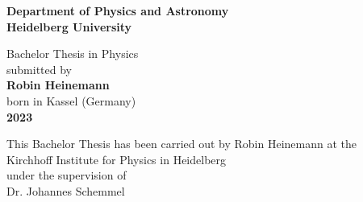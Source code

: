 \begin{titlepage}
\begin{center}
 
\Large\textbf{Department of Physics and Astronomy\\
Heidelberg University}

\vspace{18cm}

\normalsize
Bachelor Thesis in Physics\\
submitted by\\
\vspace{0.5cm}
\Large\textbf{Robin Heinemann}\\
\normalsize
\vspace{0.5cm}
born in Kassel (Germany)\\
\vspace{0.5cm}
\Large\textbf{2023}
\normalsize

\newpage




\Large\textbf{\thesisTitle}

\vspace{18cm}

\normalsize
This Bachelor Thesis has been carried out by Robin Heinemann at the\\
Kirchhoff Institute for Physics in Heidelberg\\
under the supervision of\\
Dr. Johannes Schemmel

\vfill
\end{center}

\end{titlepage}
